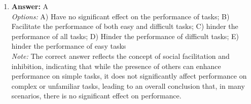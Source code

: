 \documentclass[12pt]{article}
\begin{document}
\begin{enumerate}[label=\arabic*.]
\\ \textit{Note:} The correct answer is supported by the fact that during the babbling stage, infants begin to produce sounds that are primarily influenced by the phonetic patterns of their native language, gradually narrowing their vocalizations to the specific phonemes they are exposed to in their linguistic environment.
\item \textbf{Answer:} A
\\ \textit{Options:} A) Have no significant effect on the performance of tasks; B) Facilitate the performance of both easy and difficult tasks; C) hinder the performance of all tasks; D) Hinder the performance of difficult tasks; E) hinder the performance of easy tasks
\\ \textit{Note:} The correct answer reflects the concept of social facilitation and inhibition, indicating that while the presence of others can enhance performance on simple tasks, it does not significantly affect performance on complex or unfamiliar tasks, leading to an overall conclusion that, in many scenarios, there is no significant effect on performance.
\end{enumerate}
\end{document}
